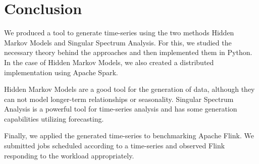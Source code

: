 \chapter{Conclusion}\label{chapter:conclusion}

We produced a tool to generate time-series using the two methods Hidden Markov Models and Singular Spectrum Analysis. For this, we studied the necessary theory behind the approaches and then implemented them in Python. In the case of Hidden Markov Models, we also created a distributed implementation using Apache Spark. 

Hidden Markov Models are a good tool for the generation of data, although they can not model longer-term relationships or seasonality. Singular Spectrum Analysis is a powerful tool for time-series analysis and has some generation capabilities utilizing forecasting. 

Finally, we applied the generated time-series to benchmarking Apache Flink. We submitted jobs scheduled according to a time-series and observed Flink responding to the workload appropriately. 